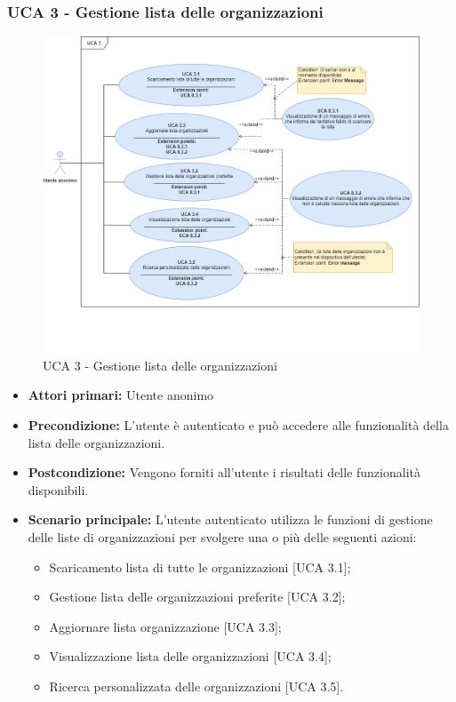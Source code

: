 \subsubsection{UCA 3 - Gestione lista delle organizzazioni}%
\begin{figure}[h]
	\centering
	\includegraphics[scale=0.5, center]{Sezioni/UseCase/Immagini/UCA3.png}
	\caption{UCA 3 - Gestione lista delle organizzazioni}
\end{figure} 

\begin{itemize}
\item \textbf{Attori primari:} Utente anonimo
\item \textbf{Precondizione:} L'utente è autenticato e può accedere alle funzionalità della lista delle organizzazioni.
\item \textbf{Postcondizione:} Vengono forniti all'utente i risultati delle funzionalità disponibili.
\item \textbf{Scenario principale:} L'utente autenticato utilizza le funzioni di gestione delle liste di organizzazioni per svolgere una o più delle seguenti azioni:
	\begin{itemize}
		\item Scaricamento lista di tutte le organizzazioni [UCA 3.1];
		\item Gestione lista delle organizzazioni preferite [UCA 3.2];
		\item Aggiornare lista organizzazione [UCA 3.3];
		\item Visualizzazione lista delle organizzazioni [UCA 3.4];
		\item Ricerca personalizzata delle organizzazioni [UCA 3.5].
	\end{itemize}
\end{itemize}

